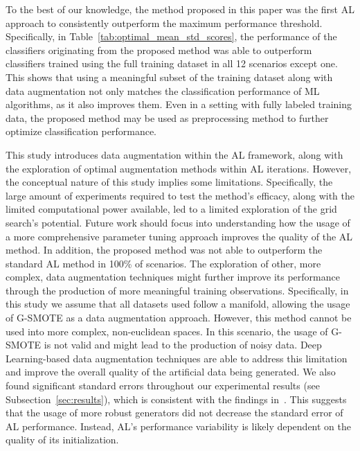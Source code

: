 \documentclass[parskip=full]{scrartcl}
\begin{document}
To the best of our knowledge, the method proposed in this paper was the first
AL approach to consistently outperform the maximum performance threshold.
Specifically, in Table~\ref{tab:optimal_mean_std_scores}, the performance of
the classifiers originating from the proposed method was able to outperform
classifiers trained using the full training dataset in all 12 scenarios except
one. This shows that using a meaningful subset of the training dataset along
with data augmentation not only matches the classification performance of ML
algorithms, as it also improves them. Even in a setting with fully labeled
training data, the proposed method may be used as preprocessing method to
further optimize classification performance.

This study introduces data augmentation within the AL framework, along with
the exploration of optimal augmentation methods within AL iterations. However,
the conceptual nature of this study implies some limitations. Specifically,
the large amount of experiments required to test the method's efficacy, along
with the limited computational power available, led to a limited exploration
of the grid search's potential. Future work should focus into understanding
how the usage of a more comprehensive parameter tuning approach improves the
quality of the AL method. In addition, the proposed method was not able to
outperform the standard AL method in 100\% of scenarios. The exploration of
other, more complex, data augmentation techniques might further improve its
performance through the production of more meaningful training observations.
Specifically, in this study we assume that all datasets used follow a
manifold, allowing the usage of G-SMOTE as a data augmentation approach.
However, this method cannot be used into more complex, non-euclidean spaces.
In this scenario, the usage of G-SMOTE is not valid and might lead to the
production of noisy data. Deep Learning-based data augmentation techniques are
able to address this limitation and improve the overall quality of the
artificial data being generated. We also found significant standard errors
throughout our experimental results (see Subsection~\ref{sec:results}), which
is consistent with the findings in~\cite{Fonseca2021, Kottke2017}. This
suggests that the usage of more robust generators did not decrease the
standard error of AL performance. Instead, AL's performance variability is
likely dependent on the quality of its initialization.
\end{document}
